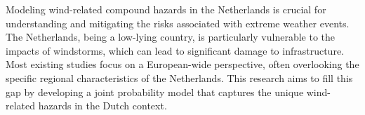 Modeling wind-related compound hazards in the Netherlands is crucial for understanding and mitigating the risks associated with extreme weather events. The Netherlands, being a low-lying country, is particularly vulnerable to the impacts of windstorms, which can lead to significant damage to infrastructure. Most existing studies focus on a European-wide perspective, often overlooking the specific regional characteristics of the Netherlands. This research aims to fill this gap by developing a joint probability model that captures the unique wind-related hazards in the Dutch context.